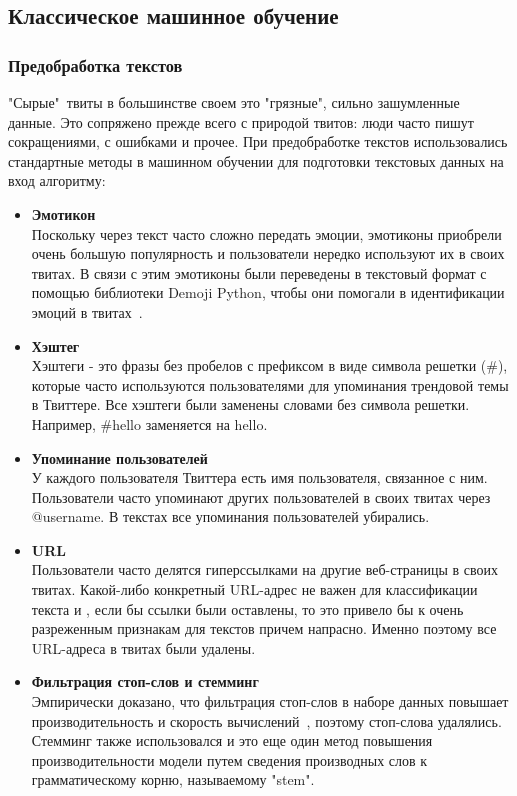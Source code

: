 \documentclass{article}
\begin{document}
\subsection{Классическое машинное обучение}
\subsubsection{Предобработка текстов}
"Сырые"\ твиты в большинстве своем это "грязные"{}, сильно зашумленные данные. Это сопряжено прежде всего с природой твитов: люди часто пишут сокращениями, с ошибками и прочее. При предобработке текстов использовались стандартные методы в машинном обучении для подготовки текстовых данных на вход алгоритму:
\begin{itemize}
    \item {\bfseries Эмотикон}\\
    Поскольку через текст часто сложно передать эмоции, эмотиконы приобрели очень большую популярность и пользователи нередко используют их в своих твитах. В связи с этим эмотиконы были переведены в текстовый формат с помощью библиотеки Demoji Python, чтобы они помогали в идентификации эмоций в твитах~\cite{wolny}.
    \item {\bfseries Хэштег}\\
    Хэштеги - это фразы без пробелов с префиксом в виде символа решетки (\#), которые часто используются пользователями для упоминания трендовой темы в Твиттере. Все хэштеги были заменены словами без символа решетки. Например, \#hello заменяется на hello. 
    \item{\bfseries Упоминание пользователей}\\
    У каждого пользователя Твиттера есть имя пользователя, связанное с ним. Пользователи часто упоминают других пользователей в своих твитах через @username. В текстах все упоминания пользователей убирались.
    \item{\bfseries URL}\\
    Пользователи часто делятся гиперссылками на другие веб-страницы в своих твитах. Какой-либо конкретный URL-адрес не важен для классификации текста и , если бы ссылки были оставлены, то это привело бы к очень разреженным признакам для текстов причем напрасно. Именно поэтому 
все URL-адреса в твитах были удалены.
    \item{\bfseries Фильтрация стоп-слов и стемминг}\\
    Эмпирически доказано, что фильтрация стоп-слов в наборе данных повышает производительность и скорость вычислений~\cite{saif}, поэтому стоп-слова удалялись. Стемминг также использовался и это еще один метод повышения производительности модели путем сведения производных слов к грамматическому корню, называемому "stem".
\end{itemize}
\end{document}
